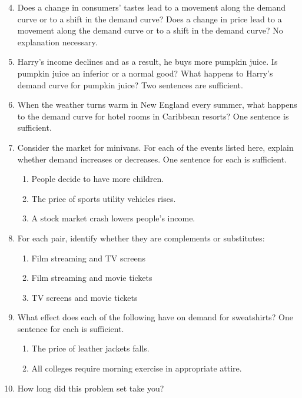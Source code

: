 \documentclass{article}
\begin{document}
\begin{enumerate}
\setcounter{enumi}{3}

\item Does a change in consumers' tastes lead to a movement along the demand curve or to a shift in the demand curve? Does a change in price lead to a movement along the demand curve or to a shift in the demand curve? No explanation necessary. 

\item Harry's income declines and as a result, he buys more pumpkin juice. Is pumpkin juice an inferior or a normal good? What happens to Harry's demand curve for pumpkin juice? Two sentences are sufficient.

\item When the weather turns warm in New England every summer, what happens to the demand curve for hotel rooms in Caribbean resorts? One sentence is sufficient.

\item Consider the market for minivans. For each of the events listed here, explain whether demand increases or decreases. One sentence for each is sufficient.

	\begin{enumerate}
	
	\item People decide to have more children.
	
	\item The price of sports utility vehicles rises.
	
	\item A stock market crash lowers people's income.
	
	\end{enumerate}
	
\item For each pair, identify whether they are complements or substitutes:

	\begin{enumerate}
	
	\item Film streaming and TV screens
	
	\item Film streaming and movie tickets
	
	\item TV screens and movie tickets
	
	\end{enumerate}
	
\item What effect does each of the following have on demand for sweatshirts? One sentence for each is sufficient. 

	\begin{enumerate}
	
	\item The price of leather jackets falls.
	
	\item All colleges require morning exercise in appropriate attire.
	
	\end{enumerate}
	
\item How long did this problem set take you?

\end{enumerate}
\end{document}
